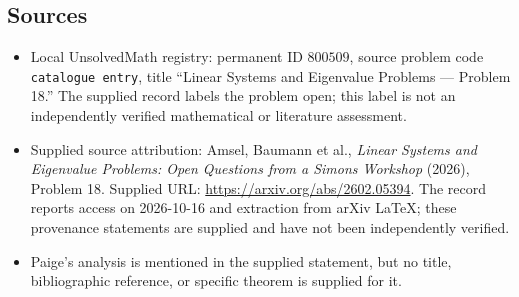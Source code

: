 \documentclass[11pt]{article}
\begin{document}
\subsection{Sources}
\begin{itemize}
\item Local UnsolvedMath registry: permanent ID \(800509\), source problem code \texttt{catalogue entry}, title ``Linear Systems and Eigenvalue Problems --- Problem 18.'' The supplied record labels the problem open; this label is not an independently verified mathematical or literature assessment.
\item Supplied source attribution: Amsel, Baumann et al., \emph{Linear Systems and Eigenvalue Problems: Open Questions from a Simons Workshop} (2026), Problem 18. Supplied URL: \url{https://arxiv.org/abs/2602.05394}. The record reports access on 2026-10-16 and extraction from arXiv LaTeX; these provenance statements are supplied and have not been independently verified.
\item Paige's analysis is mentioned in the supplied statement, but no title, bibliographic reference, or specific theorem is supplied for it.
\end{itemize}
\end{document}
